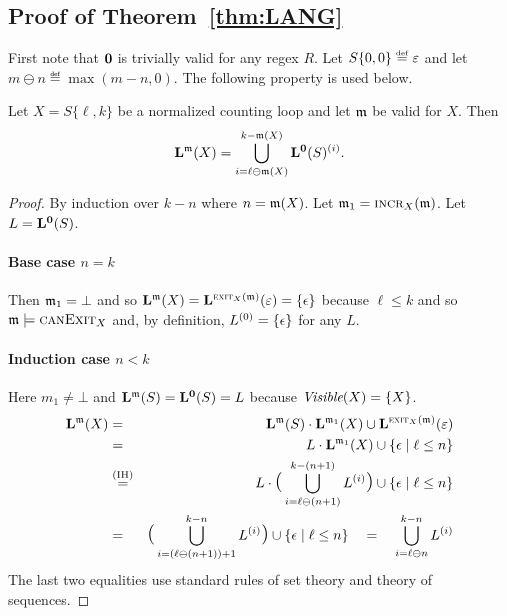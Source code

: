 \subsection{Proof of Theorem~\ref{thm:LANG}}\label{app:thmLANG}

First note that $\memInit$ is trivially valid for any regex $R$.
%
Let $S\{0,0\}\eqdef\emp$ and let $m\ominus n \eqdef \max(m-n,0)$.
%
The following property is used below.  

\begin{lemma}
  \label{lemma:COUNTING}
  Let $X=S\{\ell,k\}$ be a normalized counting loop and let $\mem$ be valid for $X$. Then
  $$
   \LANG{\mem}{X} = \bigcup_{i=\ell\ominus \mem(X)}^{k-\mem(X)}\LANG{\memInit}{S}^{(i)}.
  $$
\end{lemma}
\begin{proof}
    By induction over $k-n$ where
   $n=\mem(X)$. Let $\mem_1=\IncrOp[X](\mem)$. Let $L=\LANG{\memInit}{S}$.

  \paragraph{Base case $n=k$}
  Then $\mem_1=\bot$ and so
  $\LANG{\mem}{X}=\LANG{\ExitOp[X](\mem)}{\emp} = \{\eps\}$
  because $\ell \leq k$ and so $\mem\models\CanExit{X}$ and, by definition,
  $L^{(0)}=\{\eps\}$ for any $L$.

  \paragraph{Induction case $n<k$}
   Here $m_1\neq\bot$ and $\LANG{\mem}{S}=\LANG{\memInit}{S} = L$ because $\VISIBLE{X}=\{X\}$.
\begin{eqnarray*}
  \LANG{\mem}{X} &=&  \LANG{\mem}{S}\cdot\LANG{\mem_1}{X}\cup\LANG{\ExitOp[X](\mem)}{\emp} \\
  &=& L\cdot\LANG{\mem_1}{X}\cup\{\eps\mid \ell\leq n\} \\
  &\stackrel{\textrm{(IH)}}{=}&
  L\cdot
  \LPAR
  \bigcup_{i=\ell\ominus (n+1)}^{k-(n+1)}L^{(i)}
  \RPAR
  \cup\{\eps\mid \ell\leq n\}\\
  &=&
  \LPAR
  \bigcup_{i=(\ell\ominus (n+1))+1}^{k-n}L^{(i)}
  \RPAR
  \cup\{\eps\mid \ell\leq n\} \quad = \quad
  \bigcup_{i=\ell\ominus n}^{k-n}L^{(i)}
\end{eqnarray*}
The last two equalities use standard rules of set theory and theory of sequences.
\end{proof}

